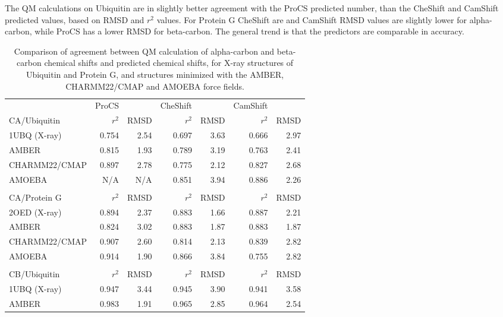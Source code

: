 The QM calculations on Ubiquitin are in slightly better agreement with the ProCS predicted number, than the CheShift and CamShift predicted values, based on RMSD and $r^2$ values. For Protein G CheShift are and CamShift RMSD values are slightly lower for alpha-carbon, while ProCS has a lower RMSD for beta-carbon.
The general trend is that the predictors are comparable in accuracy.





\begin{table}[h]
    \caption{Comparison of agreement between QM calculation of alpha-carbon and beta-carbon chemical shifts and predicted chemical shifts, for X-ray structures of Ubiquitin and Protein G, and structures minimized with the AMBER, CHARMM22/CMAP and AMOEBA force fields.}
    \begin{center}
    \begin{threeparttable}
    \begin{tabular}{l r r r r r r}
               & ProCS  &       &  CheShift&      &  CamShift& \\
CA/Ubiquitin   & $r^2$  & RMSD  &  $r^2$   &RMSD  &  $r^2$   &RMSD\\\hline
1UBQ (X-ray)   & 0.754  & 2.54  &  0.697   &3.63  &  0.666   &2.97\\
AMBER          & 0.815  & 1.93  &  0.789   &3.19  &  0.763   &2.41\\
CHARMM22/CMAP  & 0.897  & 2.78  &  0.775   &2.12  &  0.827   &2.68\\
AMOEBA         & N/A    & N/A   &  0.851   &3.94  &  0.886   &2.26\\
 &&&&&&\\
CA/Protein G   & $r^2$  & RMSD  &  $r^2$   &RMSD  &  $r^2$   &RMSD\\\hline
2OED (X-ray)   & 0.894  & 2.37  &  0.883   &1.66  &  0.887   &2.21\\
AMBER          & 0.824  & 3.02  &  0.883   &1.87  &  0.883   &1.87\\
CHARMM22/CMAP  & 0.907  & 2.60  &  0.814   &2.13  &  0.839   &2.82\\
AMOEBA         & 0.914  & 1.90  &  0.866   &3.84  &  0.755   &2.82\\
 &&&&&&\\
CB/Ubiquitin   & $r^2$  & RMSD  &  $r^2$   &RMSD  &  $r^2$   &RMSD\\\hline
1UBQ (X-ray)   & 0.947  & 3.44  &  0.945   &3.90  &  0.941   &3.58\\
AMBER          & 0.983  & 1.91  &  0.965   &2.85  &  0.964   &2.54\\

\end{tabular}
\end{threeparttable}
\end{center}
\end{table}
